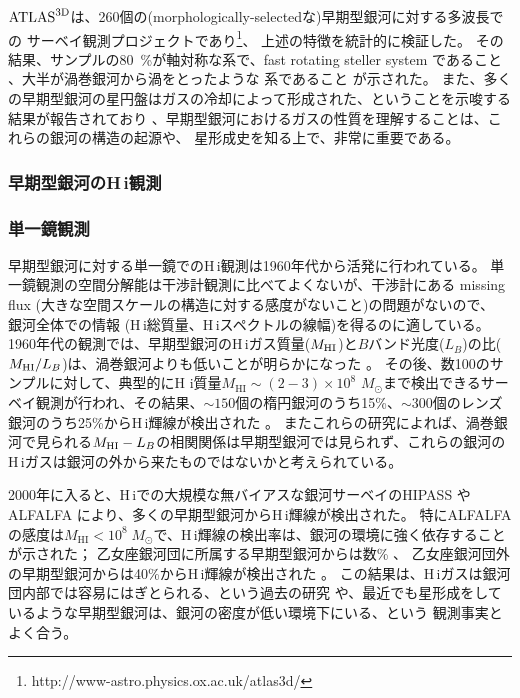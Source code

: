$\mbox{ATLAS}^{\rm 3D}$は、260個の(morphologically-selectedな)早期型銀河に対する多波長での
サーベイ観測プロジェクトであり\footnote{http://www-astro.physics.ox.ac.uk/atlas3d/}、
上述の特徴を統計的に検証した。
その結果、サンプルの80~\%が軸対称な系で、fast rotating steller system
であること \citep{2011MNRAS.414.2923K, 2011MNRAS.414..888E}、大半が渦巻銀河から渦をとったような
系であること \citep{2011MNRAS.416.1680C}が示された。
また、多くの早期型銀河の星円盤はガスの冷却によって形成された、ということを示唆する結果が報告されており \citep{2011MNRAS.417..845K}、早期型銀河におけるガスの性質を理解することは、これらの銀河の構造の起源や、
星形成史を知る上で、非常に重要である。


\subsubsection{早期型銀河のH\,{\sc i}観測}


\subsubsection{単一鏡観測}

早期型銀河に対する単一鏡でのH\,{\sc i}観測は1960年代から活発に行われている。
単一鏡観測の空間分解能は干渉計観測に比べてよくないが、干渉計にある
missing flux (大きな空間スケールの構造に対する感度がないこと)の問題がないので、
銀河全体での情報 (H\,{\sc i}総質量、H\,{\sc i}スペクトルの線幅)を得るのに適している。
1960年代の観測では、早期型銀河のH\,{\sc i}ガス質量($M_{\rm HI}$)と$B$バンド光度($L_B$)の比($M_{\rm HI}/L_B$)は、渦巻銀河よりも低いことが明らかになった \citep[e.g.,][]{1969A&A.....3..281G}。
その後、数100のサンプルに対して、典型的にH {\sc i}質量$M_\mathrm{HI}\sim (2-3)\times10^8$ $M_\odot$まで検出できるサーベイ観測が行われ、その結果、$\sim150$個の楕円銀河のうち15\%、$\sim300個$のレンズ銀河のうち25\%からH\,{\sc i}輝線が検出された \citep{1985AJ.....90..454K,1986AJ.....91...23W}。
またこれらの研究によれば、渦巻銀河で見られる$M_{\rm HI}-L_B$の相関関係は早期型銀河では見られず、これらの銀河のH\,{\sc i}ガスは銀河の外から来たものではないかと考えられている。

2000年に入ると、H\,{\sc i}での大規模な無バイアスな銀河サーベイのHIPASS \citep{2001MNRAS.322..486B}やALFALFA \citep{2005AJ....130.2598G}により、多くの早期型銀河からH\,{\sc i}輝線が検出された。
特にALFALFAの感度は$M_\mathrm{HI}<10^8\; M_\odot$で、H\,{\sc i}輝線の検出率は、銀河の環境に強く依存することが示された；
乙女座銀河団に所属する早期型銀河からは数\% \citep{2007A&A...474..851D}、
乙女座銀河団外の早期型銀河からは40\%からH\,{\sc i}輝線が検出された \citep{2009A&A...498..407G}。
この結果は、H\,{\sc i}ガスは銀河団内部では容易にはぎとられる、という過去の研究 \citep[e.g.,][]{1983AJ.....88..881G}や、最近でも星形成をしているような早期型銀河は、銀河の密度が低い環境下にいる、という
観測事実\citep{2010MNRAS.404.1775T}とよく合う。


